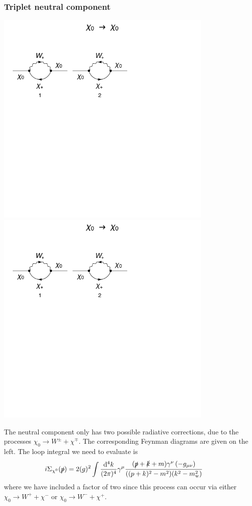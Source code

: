 \documentclass[11pt]{article}
\def\cn{\chi^0}
\renewcommand{\d}{\ensuremath{\operatorname{d}\!}}
\begin{document}
\subsubsection{Triplet neutral component}
\noindent\begin{minipage}{0.3\textwidth}
\includegraphics[width=0.8\textwidth]{1loop_a.pdf}\\
\includegraphics[width=0.8\textwidth]{1loop_b.pdf}
\end{minipage}
\noindent\begin{minipage}{0.7\textwidth}

The neutral component only has two possible radiative corrections, due to the processes $\chi_0\rightarrow W^{\pm} + \chi^{\mp}$.  The corresponding Feynman diagrams are given on the left.  The loop integral we need to evaluate is
\begin{align}
i\Sigma_{\cn}(\slashed{p})&= 2 (g)^2 \int \frac{\d^4k}{(2\pi)^4} \gamma^{\mu}\frac{(\slashed{p}+\slashed{k}+m)\gamma^{\nu}\left(-g_{\mu\nu}\right)}{((p+k)^2-m^2)(k^2-m_{\text{w}}^2)}\label{eqn:cn_loop}
\end{align}
where we have included a factor of two since this process can occur via either $\chi_0\rightarrow W^+ + \chi^-$ or $\chi_0\rightarrow W^- + \chi^+$.  
\end{minipage}
\end{document}
